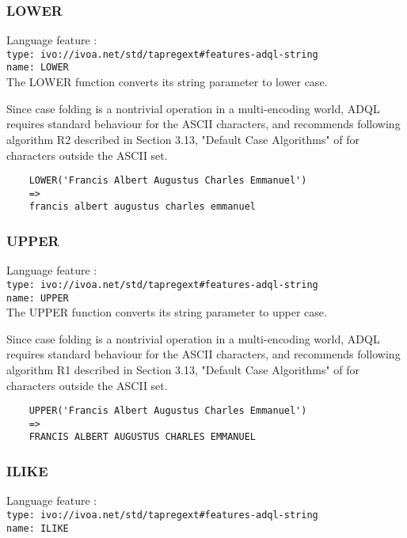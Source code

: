 \documentclass[11pt,a4paper]{ivoa}
\begin{document}
\subsubsection{LOWER}
\label{sec:string.functions.lower}
{\footnotesize Language feature :}\\
{\footnotesize \verb|type: ivo://ivoa.net/std/tapregext#features-adql-string|}\\
{\footnotesize \verb|name: LOWER|}\\

The LOWER function converts its string parameter to lower case.

Since case folding is a nontrivial operation in a multi-encoding world,
ADQL requires standard behaviour for the ASCII characters, and recommends
following algorithm R2 described in Section 3.13, "Default Case Algorithms"
of \citet{std:UNICODE} for characters outside the ASCII set.

\begin{verbatim}
    LOWER('Francis Albert Augustus Charles Emmanuel')
    =>
    francis albert augustus charles emmanuel
\end{verbatim}

\subsubsection{UPPER}
\label{sec:string.functions.upper}
{\footnotesize Language feature :}\\
{\footnotesize \verb|type: ivo://ivoa.net/std/tapregext#features-adql-string|}\\
{\footnotesize \verb|name: UPPER|}\\

The UPPER function converts its string parameter to upper case.

Since case folding is a nontrivial operation in a multi-encoding world,
ADQL requires standard behaviour for the ASCII characters, and recommends
following algorithm R1 described in Section 3.13, "Default Case Algorithms"
of \citet{std:UNICODE} for characters outside the ASCII set.

\begin{verbatim}
    UPPER('Francis Albert Augustus Charles Emmanuel')
    =>
    FRANCIS ALBERT AUGUSTUS CHARLES EMMANUEL
\end{verbatim}

\subsubsection{ILIKE}
\label{sec:string.functions.ilike}
{\footnotesize Language feature :}\\
{\footnotesize \verb|type: ivo://ivoa.net/std/tapregext#features-adql-string|}\\
{\footnotesize \verb|name: ILIKE|}\\
\end{document}
